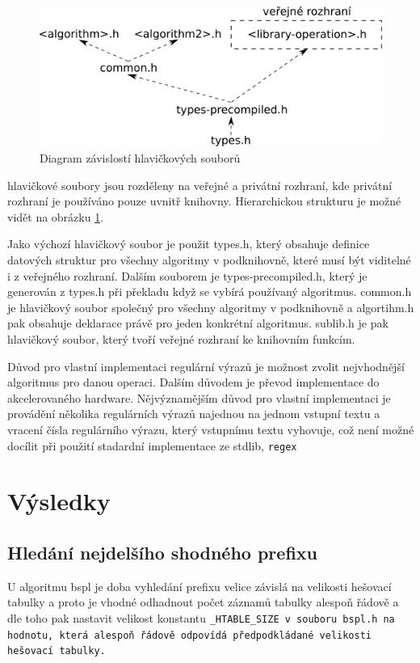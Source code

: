 \begin{figure}[!htb]
\centering
\includegraphics[scale=.25]{fig/header-dependencies.pdf}
\caption{Diagram závislostí hlavičkových souborů}
\label{fig:header-dependecies}
\end{figure}

hlavičkové soubory jsou rozděleny na veřejné a privátní rozhraní, kde privátní rozhraní je používáno pouze uvnitř knihovny. Hierarchickou strukturu je možné vidět na obrázku \ref{fig:header-dependecies}.

Jako výchozí hlavičkový soubor je použit types.h, který obsahuje definice datových struktur pro všechny algoritmy v podknihovně, které musí být viditelné i z veřejného rozhraní. Dalším souborem je types-precompiled.h, který je generován z types.h při překladu když se vybírá používaný algoritmus. common.h je hlavičkový soubor společný pro všechny algoritmy v podknihovně a algortihm.h pak obsahuje deklarace právě pro jeden konkrétní algoritmus.
sublib.h je pak hlavičkový soubor, který tvoří veřejné rozhraní ke knihovním funkcím.



Důvod pro vlastní implementaci regulární výrazů je možnost zvolit nejvhodnější algoritmus pro danou operaci.
Dalším důvodem je převod implementace do akcelerovaného hardware.
Nějvýznamějším důvod pro vlastní implementaci je provádění několika regulárních výrazů najednou na jednom vstupní textu a vracení čísla regulárního výrazu, který vstupnímu textu vyhovuje, což není možné docílit při použití stadardní implementace ze stdlib, {\tt regex}

\chapter{Výsledky}
\section{Hledání nejdelšího shodného prefixu}
U algoritmu bspl je doba vyhledání prefixu velice závislá na velikosti hešovací tabulky a proto je vhodné odhadnout počet záznamů tabulky alespoň řádově a dle toho pak nastavit velikost konstantu \tt{\_HTABLE\_SIZE} v souboru bspl.h na hodnotu, která alespoň řádově odpovídá předpodkládané velikosti hešovací tabulky.

